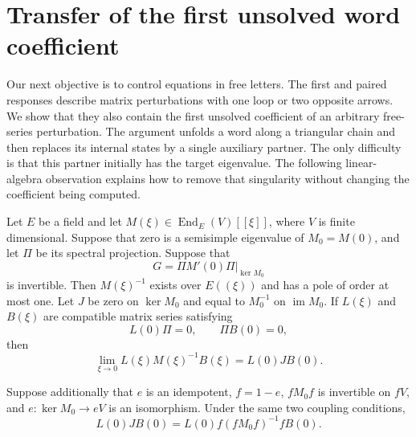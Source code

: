 \section{Transfer of the first unsolved word coefficient}
\label{sec:word-transfer}

Our next objective is to control equations in free letters.  The first and
paired responses describe matrix perturbations with one loop or two opposite
arrows.  We show that they also contain the first unsolved coefficient of an
arbitrary free-series perturbation.  The argument unfolds a word along a
triangular chain and then replaces its internal states by a single auxiliary
partner.  The only difficulty is that this partner initially has the target
eigenvalue.  The following linear-algebra observation explains how to remove
that singularity without changing the coefficient being computed.

\begin{lemma}
\label{lem:killed-pole}
Let $E$ be a field and let $M(\xi)\in\operatorname{End}_E(V)[[\xi]]$, where
$V$ is finite dimensional.  Suppose that zero is a semisimple eigenvalue of
$M_0=M(0)$, and let $\Pi$ be its spectral projection.  Suppose that
\[
 G=\Pi M'(0)\Pi\big|_{\ker M_0}
\]
is invertible.  Then $M(\xi)^{-1}$ exists over $E((\xi))$ and has a pole of
order at most one.  Let $J$ be zero on $\ker M_0$ and equal to $M_0^{-1}$ on
$\operatorname{im}M_0$.  If $L(\xi)$ and $B(\xi)$ are compatible matrix
series satisfying
\[
 L(0)\Pi=0,\qquad \Pi B(0)=0,
\]
then
\begin{equation}
\label{eq:killed-pole-limit}
 \lim_{\xi\to0}L(\xi)M(\xi)^{-1}B(\xi)=L(0)JB(0).
\end{equation}

Suppose additionally that $e$ is an idempotent, $f=1-e$,
$fM_0f$ is invertible on $fV$, and $e:\ker M_0\to eV$ is an isomorphism.
Under the same two coupling conditions,
\begin{equation}
\label{eq:fixed-complement-inverse}
 L(0)JB(0)=L(0)f(fM_0f)^{-1}fB(0).
\end{equation}
\end{lemma}

